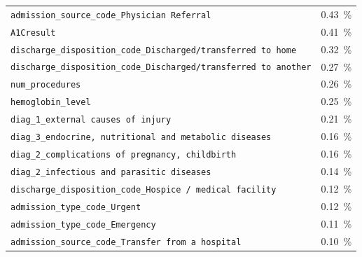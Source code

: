 \documentclass[a4paper,11pt]{article}
\begin{document}
\begin{table}[htb]
\begin{tabularx}{\textwidth}{Pc}
\texttt{\small admission\_source\_code\_Physician Referral} & \SI{0.43}{\percent} \\
\texttt{\small A1Cresult} & \SI{0.41}{\percent} \\
\texttt{\small discharge\_disposition\_code\_Discharged/transferred to home} & \SI{0.32}{\percent} \\
\texttt{\small discharge\_disposition\_code\_Discharged/transferred to another} & \SI{0.27}{\percent} \\
\texttt{\small num\_procedures} & \SI{0.26}{\percent} \\
\texttt{\small hemoglobin\_level} & \SI{0.25}{\percent} \\
\texttt{\small diag\_1\_external causes of injury} & \SI{0.21}{\percent} \\
\texttt{\small diag\_3\_endocrine, nutritional and metabolic diseases} & \SI{0.16}{\percent} \\
\texttt{\small diag\_2\_complications of pregnancy, childbirth} & \SI{0.16}{\percent} \\
\texttt{\small diag\_2\_infectious and parasitic diseases} & \SI{0.14}{\percent} \\
\texttt{\small discharge\_disposition\_code\_Hospice / medical facility} & \SI{0.12}{\percent} \\
\texttt{\small admission\_type\_code\_Urgent} & \SI{0.12}{\percent} \\
\texttt{\small admission\_type\_code\_Emergency} & \SI{0.11}{\percent} \\
\texttt{\small admission\_source\_code\_Transfer from a hospital} & \SI{0.10}{\percent} \\
\bottomrule
\end{tabularx}
\end{table}
\end{document}
